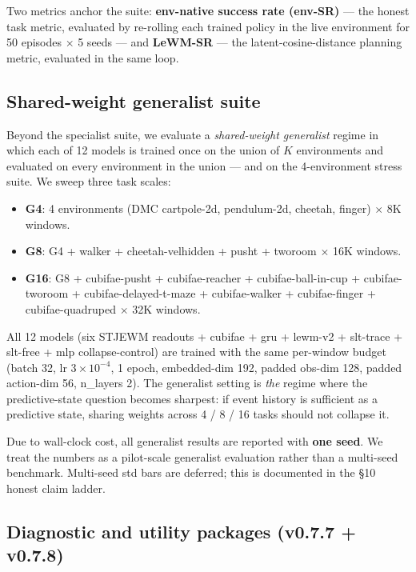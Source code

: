 \documentclass{article}
\begin{document}
Two metrics anchor the suite: \textbf{env-native success rate (env-SR)} --- the honest task metric, evaluated by re-rolling each trained policy in the live environment for 50 episodes $\times$ 5 seeds --- and \textbf{LeWM-SR} --- the latent-cosine-distance planning metric, evaluated in the same loop.

\subsection{Shared-weight generalist suite}

Beyond the specialist suite, we evaluate a \emph{shared-weight generalist} regime in which each of 12 models is trained once on the union of $K$ environments and evaluated on every environment in the union --- and on the 4-environment stress suite. We sweep three task scales:

\begin{itemize}
\item \textbf{G4}: 4 environments (DMC cartpole-2d, pendulum-2d, cheetah, finger) $\times$ 8K windows.
\item \textbf{G8}: G4 + walker + cheetah-velhidden + pusht + tworoom $\times$ 16K windows.
\item \textbf{G16}: G8 + cubifae-pusht + cubifae-reacher + cubifae-ball-in-cup + cubifae-tworoom + cubifae-delayed-t-maze + cubifae-walker + cubifae-finger + cubifae-quadruped $\times$ 32K windows.
\end{itemize}

All 12 models (six STJEWM readouts + cubifae + gru + lewm-v2 + slt-trace + slt-free + mlp collapse-control) are trained with the same per-window budget (batch 32, lr $3 \times 10^{-4}$, 1 epoch, embedded-dim 192, padded obs-dim 128, padded action-dim 56, n\_layers 2). The generalist setting is \emph{the} regime where the predictive-state question becomes sharpest: if event history is sufficient as a predictive state, sharing weights across 4 / 8 / 16 tasks should not collapse it.

Due to wall-clock cost, all generalist results are reported with \textbf{one seed}. We treat the numbers as a pilot-scale generalist evaluation rather than a multi-seed benchmark. Multi-seed std bars are deferred; this is documented in the §10 honest claim ladder.

\subsection{Diagnostic and utility packages (v0.7.7 + v0.7.8)}
\end{document}
